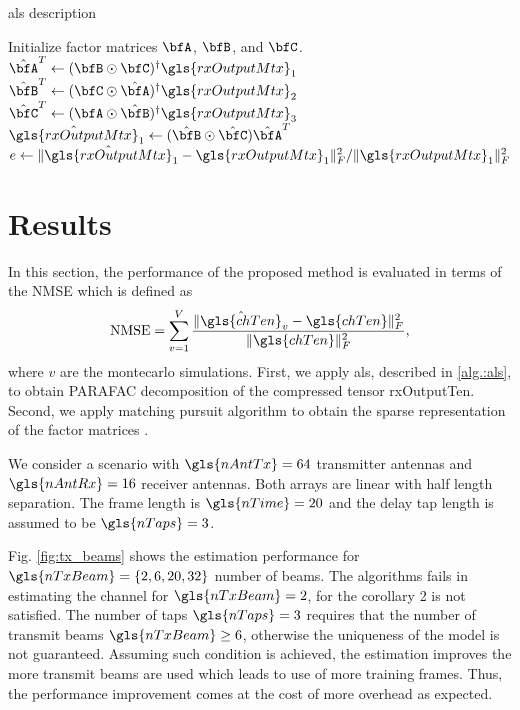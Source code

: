 \documentclass[conference]{IEEEtran}
\begin{document}
\label{sec:algorithm}
\begin{algorithm}   
    \caption{\gls{als} description } \label{alg.:als}
    \begin{algorithmic}
      \STATE Initialize factor matrices $\bfA$, $\bfB$, and $\bfC$.
      \STATE $\hat{\bfA}^T \gets (\bfB \odot \bfC)^{\dagger}\gls{rxOutputMtx}_1 $
      \STATE $\hat{\bfB}^T \gets (\bfC \odot \hat{\bfA})^{\dagger}\gls{rxOutputMtx}_2 $
      \STATE $\hat{\bfC}^T \gets ({\bfA} \odot \hat{\bfB})^{\dagger}\gls{rxOutputMtx}_3 $
      \STATE $\hat{\gls{rxOutputMtx}}_1 \gets (\hat{\bfB} \odot \hat{\bfC})\hat{\bfA}^T$
      \STATE $ e \gets \|\hat{\gls{rxOutputMtx}}_1 - \gls{rxOutputMtx}_1 \|^2_F/ \|\gls{rxOutputMtx}_1\|_F^2$
      \ENDWHILE

      
    \end{algorithmic}
\end{algorithm}

\section{Results}

In this section, the performance of the proposed method is
evaluated in terms of the \gls{NMSE} which is defined as 
\begin{equation}
  \label{eq:nmse}
  \textrm{NMSE} = \sum^{V}_{v=1} \frac{\|\hat{\gls{chTen}}_v - \gls{chTen} \|^{2}_F}{\|\gls{chTen} \|^{2}_F},
\end{equation}
where $v$ are the montecarlo simulations.
First, we apply \gls{als}, described in
\ref{alg.:als}, to obtain \gls{PARAFAC} decomposition of the compressed tensor \gls{rxOutputTen}.
Second, we apply matching pursuit algorithm to obtain the sparse representation
of the factor matrices \cite{Tropp:2008}.

We consider a scenario with  $\gls{nAntTx}=64$ transmitter antennas and
$\gls{nAntRx}=16$ receiver antennas. Both arrays are linear with half length
separation. The frame length is $\gls{nTime} = 20$ and the delay tap length is
assumed to be $\gls{nTaps}=3$. 

Fig. \ref{fig:tx_beams}  shows the estimation performance for  $\gls{nTxBeam} =
\{2,6,20,32\}$ number of beams. The algorithms fails in estimating the channel
for $\gls{nTxBeam}=2$, for the corollary 2 is not satisfied. The number of taps
$\gls{nTaps}=3$ requires that the number of transmit beams $\gls{nTxBeam} \geq 6
$, otherwise the uniqueness of the model is not guaranteed. Assuming such
condition is achieved, the estimation improves the more transmit beams are
used which leads to use of more training frames. Thus, the performance
improvement comes at the cost of more overhead as expected.
\end{document}
